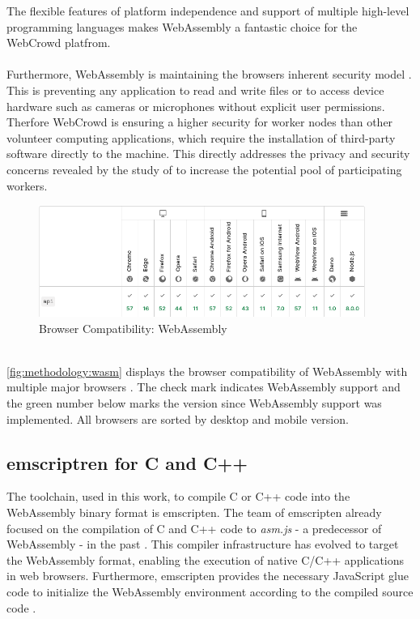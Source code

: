 The flexible features of platform independence and support of multiple high-level programming languages makes WebAssembly a fantastic choice for the WebCrowd platfrom.
\\~\\
Furthermore, WebAssembly is maintaining the browsers inherent security model \cite{methodology:wasmW3C, methodology:wasm2, methodology:wasmdocu}. This is preventing any application to read and write ﬁles or to access device hardware such as cameras or microphones without explicit user permissions. Therfore WebCrowd is ensuring a higher security for worker nodes than other volunteer computing applications, which require the installation of third-party software directly to the machine. This directly addresses the privacy and security concerns revealed by the study of \citeauthor{intro:volunteerStudy} \cite{intro:volunteerStudy} to increase the potential pool of participating workers.
\clearpage
\begin{figure}[htbp]
  \centering
  \includegraphics[width=0.95\textwidth]{gfx/figures/webassembly-browsercompability.png}
  \caption{Browser Compatibility: WebAssembly \cite{methodology:wasmdocu}}
  \label{fig:methodology:wasm}
\end{figure}
~\\
\autoref{fig:methodology:wasm} displays the browser compatibility of WebAssembly with multiple major browsers \cite{methodology:wasmdocu}. The check mark indicates WebAssembly support and the green number below marks the version since WebAssembly support was implemented. All browsers are sorted by desktop and mobile version. 

\subsection{emscriptren for C and C++}
\label{subsec:methodology:wasm:cpp}
The toolchain, used in this work, to compile C or C++ code into the WebAssembly binary format is emscripten. The team of emscripten already focused on the compilation of C and C++ code to \emph{asm.js} - a predecessor of WebAssembly - in the past \cite{methodology:emcc}. This compiler infrastructure has evolved to target the WebAssembly format, enabling the execution of native C/C++ applications in web browsers. Furthermore, emscripten provides the necessary JavaScript glue code to initialize the WebAssembly environment according to the compiled source code \cite{methodology:emcc}.

